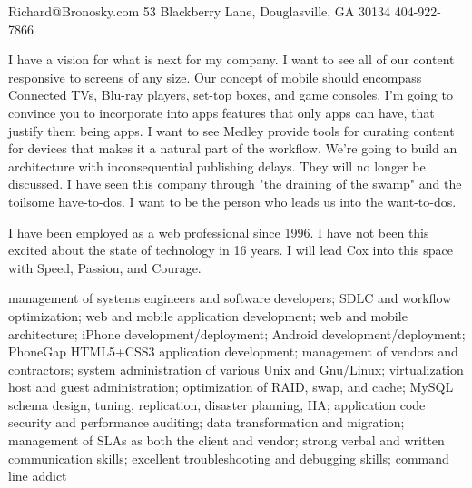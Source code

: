 \documentclass[10pt]{article}
\begin{document}
{Richard@Bronosky.com}
{53 Blackberry Lane, Douglasville, GA 30134}
{404-922-7866}

\begin{longtext}
    I have a vision for what is next for my company.
    I want to see all of our content responsive to screens of any size.
    Our concept of mobile should encompass Connected TVs, Blu-ray players, set-top boxes, and game consoles.
    I'm going to convince you to incorporate into apps features that only apps can have, that justify them being apps.
    I want to see Medley provide tools for curating content for devices that makes it a natural part of the workflow.
    We're going to build an architecture with inconsequential publishing delays. They will no longer be discussed.
    I have seen this company through "the draining of the swamp" and the toilsome have-to-dos. I want to be the person who leads us into the want-to-dos.
\end{longtext}
\shortspace
\begin{longtext}
    I have been employed as a web professional since 1996. I have not been this excited about the state of technology in 16 years. I will lead Cox into this space with Speed, Passion, and Courage.

\end{longtext}
\shortspace

\begin{longtext}
    management of systems engineers and software developers;
    SDLC and workflow optimization;
    web and mobile application development;
    web and mobile architecture;
    iPhone development/deployment;
    Android development/deployment;
    PhoneGap HTML5+CSS3 application development;
    management of vendors and contractors;
    system administration of various Unix and Gnu/Linux;
    virtualization host and guest administration;
    optimization of RAID, swap, and cache;
    MySQL schema design, tuning, replication, disaster planning, HA;
    application code security and performance auditing;
    data transformation and migration;
    management of SLAs as both the client and vendor;
    strong verbal and written communication skills;
    excellent troubleshooting and debugging skills;
    command line addict
\end{longtext}
\shortspace
\end{document}
